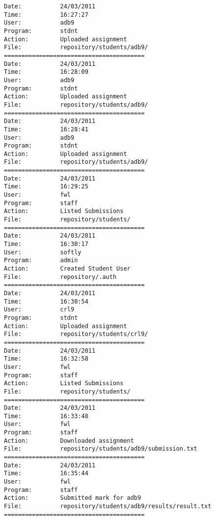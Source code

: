 \begin{verbatim}
Date:           24/03/2011
Time:           16:27:27
User:           adb9
Program:        stdnt
Action:         Uploaded assignment
File:           repository/students/adb9/
========================================
Date:           24/03/2011
Time:           16:28:09
User:           adb9
Program:        stdnt
Action:         Uploaded assignment
File:           repository/students/adb9/
========================================
Date:           24/03/2011
Time:           16:28:41
User:           adb9
Program:        stdnt
Action:         Uploaded assignment
File:           repository/students/adb9/
========================================
Date:           24/03/2011
Time:           16:29:25
User:           fwl
Program:        staff
Action:         Listed Submissions
File:           repository/students/
========================================
Date:           24/03/2011
Time:           16:30:17
User:           softly
Program:        admin
Action:         Created Student User
File:           repository/.auth
========================================
Date:           24/03/2011
Time:           16:30:54
User:           crl9
Program:        stdnt
Action:         Uploaded assignment
File:           repository/students/crl9/
========================================
Date:           24/03/2011
Time:           16:32:58
User:           fwl
Program:        staff
Action:         Listed Submissions
File:           repository/students/
========================================
Date:           24/03/2011
Time:           16:33:48
User:           fwl
Program:        staff
Action:         Downloaded assignment
File:           repository/students/adb9/submission.txt
========================================
Date:           24/03/2011
Time:           16:35:44
User:           fwl
Program:        staff
Action:         Submitted mark for adb9
File:           repository/students/adb9/results/result.txt
========================================

\end{verbatim}
